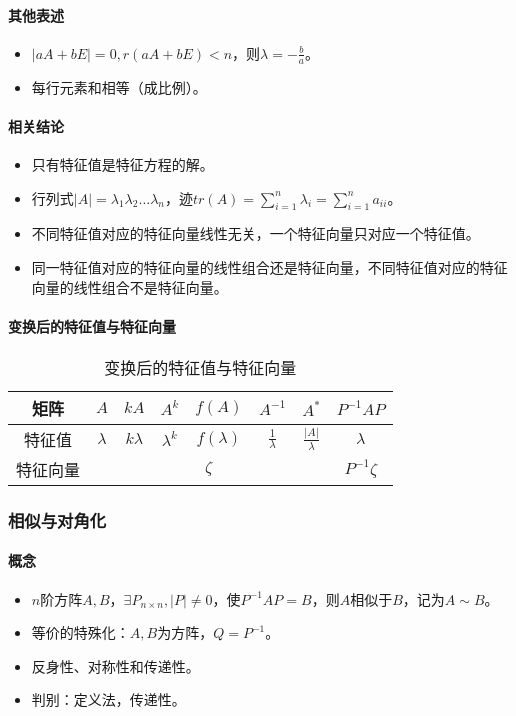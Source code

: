 \documentclass[
12pt, %
a4paper, 
oneside, %
headinclude,footinclude, %
]{scrartcl}
\begin{document}
\paragraph{其他表述}
\begin{itemize}
\item $ |aA + bE| = 0, r(aA + bE) < n $，则$ \lambda = -\frac{b}{a} $。
\item 每行元素和相等（成比例）。
\end{itemize}
\paragraph{相关结论}
\begin{itemize}
\item 只有特征值是特征方程的解。
\item 行列式$ |A| = \lambda_1 \lambda_2 \dots \lambda_n $，迹$ tr(A) = \sum_{i = 1}^n \lambda_i = \sum_{i = 1}^n a_{ii} $。
\item 不同特征值对应的特征向量线性无关，一个特征向量只对应一个特征值。
\item 同一特征值对应的特征向量的线性组合还是特征向量，不同特征值对应的特征向量的线性组合不是特征向量。
\end{itemize}
\paragraph{变换后的特征值与特征向量}
\begin{table}[H]
\centering
\begin{tabular}{|c|c|c|c|c|c|c|c|}
\hline
矩阵 & $ A $ & $ kA $ & $ A^k $ & $ f(A) $ & $ A^{-1} $ & $ A^* $ & $ P^{-1}AP $ \\
\hline
特征值 & $ \lambda $ & $ k\lambda $ & $ \lambda^k $ & $ f(\lambda) $ & $ \frac{1}{\lambda} $ & $ \frac{|A|}{\lambda} $ & $ \lambda $ \\
\hline
特征向量 & \multicolumn{6}{c|}{$ \zeta $} & $ P^{-1}\zeta $ \\
\hline
\end{tabular}
\caption{变换后的特征值与特征向量}
\end{table} 
\subsubsection[相似与对角化]{相似与对角化}
\paragraph{概念}
\begin{itemize}
\item $ n $阶方阵$ A,B $，$ \exists P_{n \times n}, |P| \neq 0 $，使$ P^{-1}AP = B $，则$ A $相似于$ B $，记为$ A \sim B $。
\item 等价的特殊化：$ A,B $为方阵，$ Q = P^{-1} $。
\item 反身性、对称性和传递性。
\item 判别：定义法，传递性。
\end{itemize}
\end{document}

